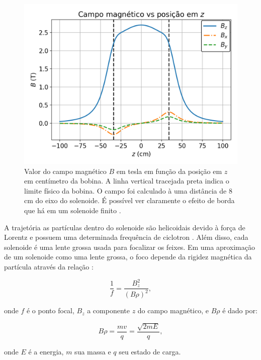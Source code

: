 \documentclass[a4paper,12pt,oneside]{book}
\begin{document}
\begin{figure}[H]
    \centering
    \includegraphics[scale = 0.85]{figs/Campo_mag.png}
    \caption{Valor do campo magnético $B$ em tesla em função da posição em $z$ em centímetro da bobina. A linha vertical tracejada preta indica o limite físico da bobina. O campo foi calculado à uma distância de 8 cm do eixo do solenoide. É possível ver claramente o efeito de borda que há em um solenoide finito \cite{magnetic_field}.}
    \label{fig:campo_mag}
\end{figure}


\par A trajetória as partículas dentro do solenoide são helicoidais devido à força de Lorentz e possuem uma determinada frequência de ciclotron \cite{ribras_leo}. Além disso, cada solenoide é uma lente grossa usada para focalizar os feixes. Em uma aproximação de um solenoide como uma lente grossa, o foco depende da rigidez magnética da partícula através da relação \cite{KOLATA1989503, zamora_mater}:

\begin{equation}
    \frac{1}{f} = \frac{B_z ^2}{(B\rho)^2},
\end{equation}

onde $f$ é o ponto focal, $B_z$ a componente $z$ do campo magnético, e $B\rho$ é dado por:

\begin{equation}
    B\rho = \frac{mv}{q} = \frac{\sqrt{2mE}}{q},
\end{equation}

onde $E$ é a energia, $m$ sua massa e $q$ seu estado de carga.
\end{document}
